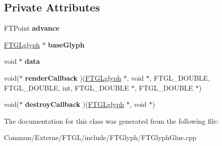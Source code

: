 \subsection*{Private Attributes}
\begin{DoxyCompactItemize}
\item 
F\+T\+Point {\bfseries advance}\hypertarget{class_f_t_custom_glyph_a489128e8290526ff08811cf5f2658df8}{}\label{class_f_t_custom_glyph_a489128e8290526ff08811cf5f2658df8}

\item 
\hyperlink{struct___f_t_g_lglyph}{F\+T\+G\+Lglyph} $\ast$ {\bfseries base\+Glyph}\hypertarget{class_f_t_custom_glyph_a3454698f6278de252e0ffb1bcd692a35}{}\label{class_f_t_custom_glyph_a3454698f6278de252e0ffb1bcd692a35}

\item 
void $\ast$ {\bfseries data}\hypertarget{class_f_t_custom_glyph_a50f21e3f846aa86f122bc5dc6c39d669}{}\label{class_f_t_custom_glyph_a50f21e3f846aa86f122bc5dc6c39d669}

\item 
void($\ast$ {\bfseries render\+Callback} )(\hyperlink{struct___f_t_g_lglyph}{F\+T\+G\+Lglyph} $\ast$, void $\ast$, F\+T\+G\+L\+\_\+\+D\+O\+U\+B\+LE, F\+T\+G\+L\+\_\+\+D\+O\+U\+B\+LE, int, F\+T\+G\+L\+\_\+\+D\+O\+U\+B\+LE $\ast$, F\+T\+G\+L\+\_\+\+D\+O\+U\+B\+LE $\ast$)\hypertarget{class_f_t_custom_glyph_a5cc4e8fbf7d9d19ce18bcca84a115ec6}{}\label{class_f_t_custom_glyph_a5cc4e8fbf7d9d19ce18bcca84a115ec6}

\item 
void($\ast$ {\bfseries destroy\+Callback} )(\hyperlink{struct___f_t_g_lglyph}{F\+T\+G\+Lglyph} $\ast$, void $\ast$)\hypertarget{class_f_t_custom_glyph_a2745b9d0a7408e86277b5151d3a11172}{}\label{class_f_t_custom_glyph_a2745b9d0a7408e86277b5151d3a11172}

\end{DoxyCompactItemize}


The documentation for this class was generated from the following file\+:\begin{DoxyCompactItemize}
\item 
Commun/\+Externe/\+F\+T\+G\+L/include/\+F\+T\+Glyph/F\+T\+Glyph\+Glue.\+cpp\end{DoxyCompactItemize}
